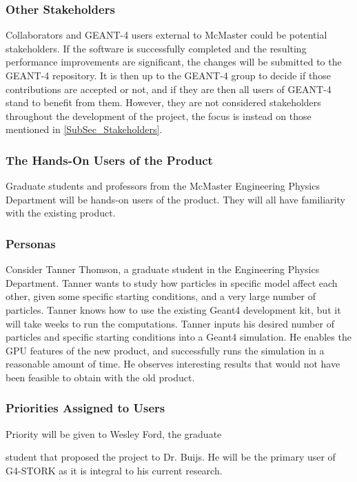 \documentclass[12pt]{article}
\newcommand{\todo}[1]{\textcolor{red}{[TODO: #1]}} \else
\newcommand{\authornote}[3]{} \newcommand{\todo}[1]{} \fi
\newcommand{\ds}[1]{\authornote{blue}{DS}{#1}} %
\newcommand{\mmp}[1]{\authornote{green}{MP}{#1}}
\begin{document}
\subsubsection{Other Stakeholders}
\mmp{removed this section as suggested by peer review}

Collaborators and GEANT-4 users external to McMaster could be potential stakeholders. If the software is successfully completed and the resulting performance improvements are significant, the changes will be submitted to the GEANT-4 repository. It is then up to the GEANT-4 group to decide if those contributions are accepted or not, and if they are then all users of GEANT-4 stand to benefit from them. However, they are not considered stakeholders throughout the development of the project, the focus is instead on those mentioned in \ref{SubSec_Stakeholders}.

\subsubsection{The Hands-On Users of the Product}
Graduate students and professors from the McMaster Engineering Physics Department will be hands-on users of the product. They will all have familiarity with the existing product. 

\subsubsection{Personas}
Consider Tanner Thomson, a graduate student in the Engineering Physics Department. Tanner wants to study how particles in specific model affect each other, given some specific starting conditions, and a very large number of particles. Tanner knows how to use the existing Geant4 development kit, but it will take weeks to run the computations. Tanner inputs his desired number of particles and specific starting conditions into a Geant4 simulation. He enables the GPU features of the new product, and successfully runs the simulation in a reasonable amount of time. He observes interesting results that would not have been feasible to obtain with the old product.\\

\subsubsection{Priorities Assigned to Users}
Priority will be given to Wesley Ford, the graduate
\ds{``graduate"} \mmp{fixed}
student that proposed the project to Dr. Buijs. He will be the primary user of G4-STORK as it is integral to his current research.
\end{document}
